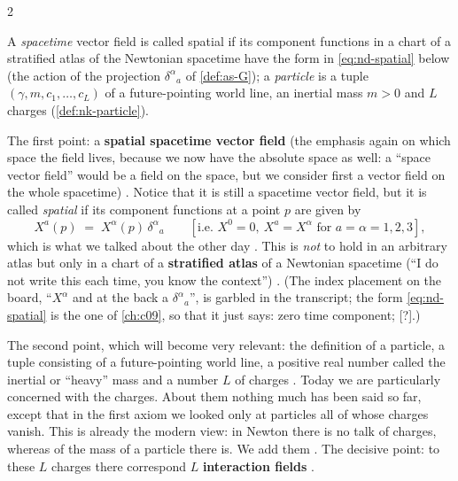 \begin{paracol}{2}
\begin{recall}
A \emph{spacetime} vector field is called spatial if its component functions in a chart of a stratified atlas of the Newtonian spacetime have the form in \eqref{eq:nd-spatial} below (the action of the projection $\delta^\alpha{}_a$ of \cref{def:as-G});
a \emph{particle} is a tuple $(\gamma,m,c_1,\dots,c_L)$ of a future-pointing world line, an inertial mass $m>0$ and $L$ charges (\cref{def:nk-particle}).
\end{recall}
The first point: a \textbf{spatial spacetime vector field} (the emphasis again on which space the field lives, because we now have the absolute space as well: a ``space vector field'' would be a field on the space, but we consider first a vector field on the whole spacetime)
. Notice that it is still a spacetime vector field, but it is called \emph{spatial} if its component functions at a point $p$ are given by
\begin{equation}\label{eq:nd-spatial}
  X^a(p)\;=\;X^\alpha(p)\,\delta^\alpha{}_a\qquad[\text{i.e.\ } X^0=0,\ X^a=X^\alpha\text{ for }a=\alpha=1,2,3],
\end{equation}
which is what we talked about the other day . This is \emph{not} to hold in an arbitrary atlas but only in a chart of a \textbf{stratified atlas} of a Newtonian spacetime (``I do not write this each time, you know the context'') .
(The index placement on the board, ``$X^\alpha$ and at the back a $\delta^\alpha{}_a$'', is garbled in the transcript; the form \eqref{eq:nd-spatial} is the one of \cref{ch:c09}, so that it just says: zero time component; [?].)

The second point, which will become very relevant: the definition of a particle, a tuple consisting of a future-pointing world line, a positive real number called the inertial or ``heavy'' mass and a number $L$ of charges .
Today we are particularly concerned with the charges. About them nothing much has been said so far, except that in the first axiom we looked only at particles all of whose charges vanish. This is already the modern view: in Newton there is no talk of charges,
whereas of the mass of a particle there is. We add them . The decisive point: to these $L$ charges there correspond $L$ \textbf{interaction fields} .


\end{paracol}
